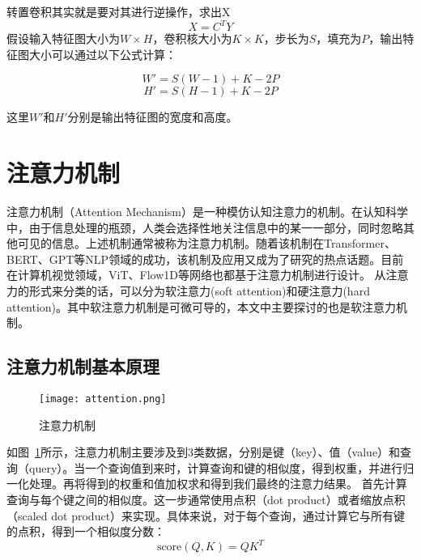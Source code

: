 转置卷积其实就是要对其进行逆操作，求出X
\begin{equation}
  X=C^T Y
\end{equation}
假设输入特征图大小为\(W \times H\)，卷积核大小为\(K \times K\)，步长为\(S\)，填充为\(P\)，输出特征图大小可以通过以下公式计算：

\[ W' = S(W-1) + K - 2P \]
\[ H' = S(H-1) + K - 2P \]

这里\(W'\)和\(H'\)分别是输出特征图的宽度和高度。

\section{注意力机制}
注意力机制（Attention Mechanism）\cite{2023AttentionAllYouNeed}是一种模仿认知注意力的机制。在认知科学中，由于信息处理的瓶颈，人类会选择性地关注信息中的某一一部分，同时忽略其他可见的信息。上述机制通常被称为注意力机制。随着该机制在Transformer\cite{2023AttentionAllYouNeed}、BERT\cite{2018BERTPretrainingDeepBidirectionalTransformersLanguageUnderstanding}、GPT\cite{2023GenerativePretrainedTransformerComprehensiveReviewEnablingTechnologiesPotentialApplicationsEmergingChallengesFutureDirections}等NLP领域的成功，该机制及应用又成为了研究的热点话题。目前在计算机视觉领域，ViT\cite{2020ImageWorth16x16WordsTransformersImageRecognitionScale}、Flow1D\cite{2022ComparisonPoolingMethodsConvolutionalNeuralNetworks}等网络也都基于注意力机制进行设计。
从注意力的形式来分类的话，可以分为软注意力(soft attention)和硬注意力(hard attention)。其中软注意力机制是可微可导的，本文中主要探讨的也是软注意力机制。

\subsection{注意力机制基本原理}

\begin{figure}[h]
  \centering
  \texttt{[image: attention.png]}
  \caption{注意力机制}
  \label{fig:attention}
\end{figure}

如图~\ref{fig:attention}所示，注意力机制主要涉及到3类数据，分别是键（key）、值（value）和查询（query）。当一个查询值到来时，计算查询和键的相似度，得到权重，并进行归一化处理。再将得到的权重和值加权求和得到我们最终的注意力结果。
首先计算查询与每个键之间的相似度。这一步通常使用点积（dot product）或者缩放点积（scaled dot product）来实现。具体来说，对于每个查询，通过计算它与所有键的点积，得到一个相似度分数：
\begin{equation}
  \text{score}(Q, K) = QK^T 
\end{equation}

